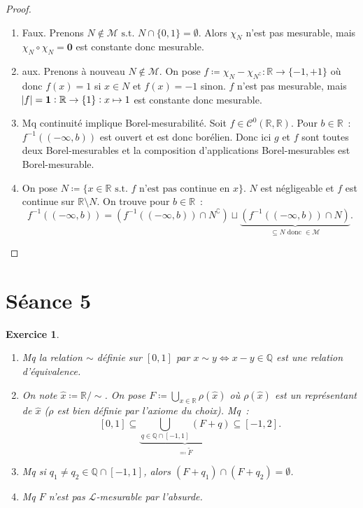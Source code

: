 \documentclass{article}
\newtheorem{ex}{Exercice}[section]
\theoremstyle{definition}
\newcommand{\minfty}{{-\infty}}
\newcommand{\st}{\text{ s.t. }}
\newcommand{\C}{\complement}
\newcommand{\Q}{{\mathbb Q}}
\newcommand{\R}{{\mathbb R}}
\begin{document}
\begin{proof}~
\begin{enumerate}
	\item Faux. Prenons $N \not \in \mathcal M \st N \cap \{0, 1\} = \emptyset$. Alors $\chi_N$ n'est pas mesurable, mais $\chi_N \circ \chi_N = \mathbf 0$
	est constante donc mesurable.
	\item aux. Prenons à nouveau $N \not \in \mathcal M$. On pose $f \coloneqq \chi_N - \chi_{N^\C} : \R \to \{-1, +1\}$ où donc $f(x) = 1$ si $x \in N$ et $f(x) = -1$ sinon.
	$f$ n'est pas mesurable, mais $\abs f = \mathbf 1 : \R \to \{1\} : x \mapsto 1$ est constante donc mesurable.
	\item Mq continuité implique Borel-mesurabilité. Soit $f \in \mathcal C^0(\R, \R)$. Pour $b \in \R$~: $f^{-1}((\minfty, b))$ est ouvert et est donc borélien.
	Donc ici $g$ et $f$ sont toutes deux Borel-mesurables et la composition d'applications Borel-mesurables est Borel-mesurable.
	\item On pose $N \coloneqq \{x \in \R \st f \text{ n'est pas continue en } x\}$. $N$ est négligeable et $f$ est continue sur $\R \setminus N$. On trouve pour $b \in \R$~:
	\[f^{-1}((\minfty, b)) = \left(f^{-1}((\minfty, b)) \cap N^\C\right) \sqcup \underbrace {\left(f^{-1}((\minfty, b)) \cap N\right)}_{\subseteq N \text{ donc } \in \mathcal M}.\]
\end{enumerate}
\end{proof}

\newpage
\section{Séance 5}
\begin{ex}
\begin{enumerate}
	\item Mq la relation $\sim$ définie sur $[0, 1]$ par $x \sim y \iff x-y \in \Q$ est une relation d'équivalence.
	\item On note $\hat x \coloneqq \R / \sim$. On pose $F \coloneqq \bigcup_{x \in \R}\rho(\hat x)$ où $\rho(\hat x)$ est un représentant de $\hat x$ ($\rho$ est bien
	définie par l'axiome du choix). Mq~:
	\[[0, 1] \subseteq \underbrace {\bigcup_{q \in \Q \cap [-1, 1]}(F+q)}_{\eqqcolon \tilde F} \subseteq [-1, 2].\]
	\item Mq si $q_1 \neq q_2 \in \Q \cap [-1, 1]$, alors $(F+q_1) \cap (F+q_2) = \emptyset$.
	\item Mq $F$ n'est pas $\mathcal L$-mesurable par l'absurde.
\end{enumerate}
\end{ex}
\end{document}
